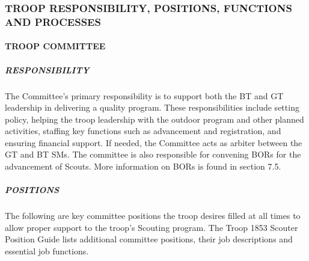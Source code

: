 \documentclass{ltxguide}
\begin{document}
\subsubsection{TROOP RESPONSIBILITY, POSITIONS, FUNCTIONS AND PROCESSES}
\paragraph{TROOP COMMITTEE}
\subparagraph{RESPONSIBILITY}
The Committee's primary responsibility is to support both the \ac{BT} and \ac{GT} leadership in delivering a quality program. These responsibilities include setting policy, helping the troop leadership with the outdoor program and other planned activities, staffing key functions such as advancement and registration, and ensuring financial support. If needed, the Committee acts as arbiter between the \ac{GT} and \ac{BT} \acp{SM}. The committee is also responsible for convening \acp{BOR}  for the advancement of Scouts. More information on \acp{BOR} is found in section 7.5. %

\subparagraph{POSITIONS}
The following are key committee positions the troop desires filled at all times to allow proper support to the troop's Scouting program. The Troop 1853 Scouter Position Guide lists additional committee positions, their job descriptions and essential job functions.
\end{document}
